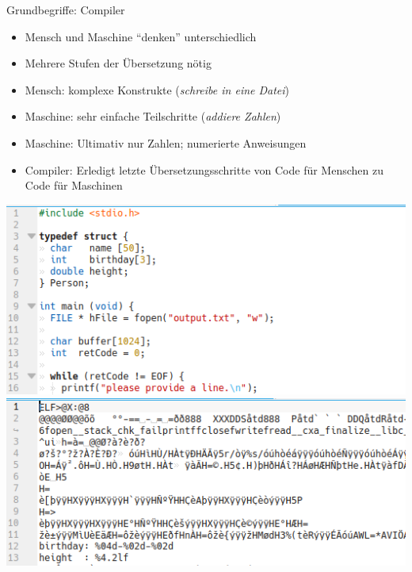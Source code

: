 \begin{frame}
%
\begin{minipage}[T]{.49\linewidth}
\begin{Large}
{Grundbegriffe: Compiler}
\end{Large}
\begin{itemize}
\item Mensch und Maschine \enquote{denken} unterschiedlich
\item Mehrere Stufen der Übersetzung nötig
\item Mensch: komplexe Konstrukte (\emph{schreibe in eine Datei})
\item Maschine: sehr einfache Teilschritte (\emph{addiere Zahlen})
\item Maschine: Ultimativ nur Zahlen; numerierte Anweisungen
\item Compiler: Erledigt letzte Übersetzungsschritte von Code für Menschen zu Code für Maschinen
\end{itemize}
\end{minipage}
%
\begin{minipage}{.49\linewidth}
\includegraphics[width=\linewidth]{./gfx/CodeRaw}
\includegraphics[width=\linewidth]{./gfx/CodeCompiled}
\end{minipage}
%
\end{frame}


